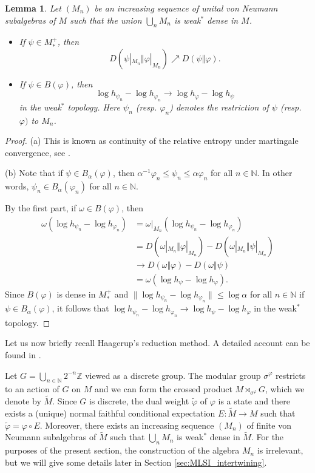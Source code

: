 \documentclass[12pt,a4paper]{amsart}
\newcommand{\1}{\mathds{1}}
\renewcommand{\phi}{\varphi}
\newcommand{\IN}{\mathbb N}
\newcommand{\IZ}{\mathbb Z}
\newcommand{\norm}[1]{\lVert#1\rVert}
\theoremstyle{plain}
\newtheorem{lemma}[proposition]{Lemma}
\theoremstyle{definition}
\theoremstyle{remark}
\begin{document}
\begin{lemma}\label{lem:martingale_conv_entropy}
Let $(M_n)$ be an increasing sequence of unital von Neumann subalgebras of $M$ such that the union $\bigcup_n M_n$ is weak$^\ast$ dense in $M$.
\begin{itemize}
\item[(a)] If $\psi\in M_\ast^+$, then
\begin{equation*}
D(\psi|_{M_n}\Vert \phi|_{M_n})\nearrow D(\psi\Vert \phi).
\end{equation*}
\item[(b)] If $\psi\in B(\phi)$, then
\begin{equation*}
\log h_{\psi_n}-\log h_{\phi_n}\to \log h_\phi-\log h_\psi
\end{equation*}
in the weak$^\ast$ topology. Here $\psi_n$ (resp. $\phi_n$) denotes the restriction of $\psi$ (resp. $\phi)$ to $M_n$.
\end{itemize}
\end{lemma}
\begin{proof}
(a) This is known as continuity of the relative entropy under martingale convergence, see \cite[Theorem 4.1]{Hia18}.

(b) Note that if $\psi\in B_{\alpha}(\phi)$, then $\alpha^{-1} \phi_n\leq \psi_n\leq \alpha \phi_n$ for all $n\in\mathbb N$. In other words, $\psi_n\in B_\alpha(\phi_n)$ for all $n\in\mathbb N$.

By the first part, if $\omega\in B(\phi)$, then
\begin{align*}
\omega(\log h_{\psi_n}-\log h_{\phi_n})&=\omega|_{M_n}(\log h_{\psi_n}-\log h_{\phi_n})\\
&=D(\omega|_{M_n}\Vert \phi|_{M_n})-D(\omega|_{M_n}\Vert \psi|_{M_n})\\
&\to D(\omega\Vert \phi)-D(\omega\Vert\psi)\\
&=\omega(\log h_\psi-\log h_\phi).
\end{align*}
Since $B(\phi)$ is dense in $M_\ast^+$ and $\norm{\log h_{\psi_n}-\log h_{\phi_n}}\leq \log\alpha$ for all $n\in\mathbb N$ if $\psi\in B_\alpha(\phi)$, it follows that $\log h_{\psi_n}-\log h_{\phi_n}\to \log h_{\psi}-\log h_\phi$ in the weak$^\ast$ topology.
\end{proof}

Let us now briefly recall Haagerup's reduction method. A detailed account can be found in \cite{HJX10}.

Let $G=\bigcup_{n\in\IN}2^{-n}\IZ$ viewed as a discrete group. The modular group $\sigma^\phi$ restricts to an action of $G$ on $M$ and we can form the crossed product $M\rtimes_{\sigma^\phi}G$, which we denote by $\tilde M$. Since $G$ is discrete, the dual weight $\tilde\phi$ of $\phi$ is a state and there exists a (unique) normal faithful conditional expectation $E\colon \tilde M\to M$ such that $\tilde\phi=\phi\circ E$. Moreover, there exists an increasing sequence $(M_n)$ of finite von Neumann subalgebras of $\tilde M$ such that $\bigcup_n M_n$ is weak$^\ast$ dense in $\tilde M$. For the purposes of the present section, the construction of the algebra $M_n$ is irrelevant, but we will give some details later in Section \ref{sec:MLSI_intertwining}.
\end{document}
